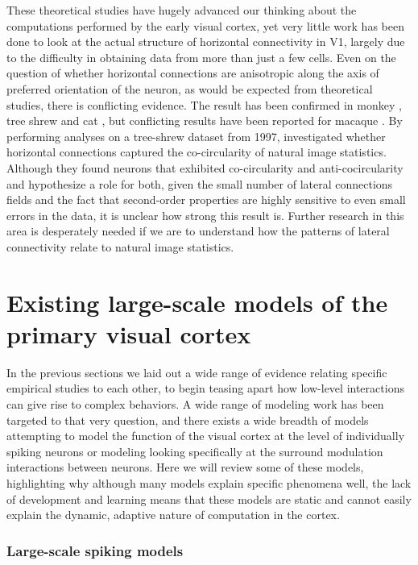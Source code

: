 These theoretical studies have hugely advanced our thinking about the
computations performed by the early visual cortex, yet very little
work has been done to look at the actual structure of horizontal
connectivity in V1, largely due to the difficulty in obtaining data
from more than just a few cells. Even on the question of whether
horizontal connections are anisotropic along the axis of preferred
orientation of the neuron, as would be expected from theoretical
studies, there is conflicting evidence. The result has been confirmed
in monkey \citep{Sincich2001}, tree shrew \citep{Bosking1997} and cat
\citep{Schmidt1997}, but conflicting results have been reported for
macaque \citep{Angelucci2002}. By performing analyses on a tree-shrew
dataset from 1997, \cite{Hunt2011} investigated whether horizontal 
connections captured the co-circularity of natural image
statistics. Although they found neurons that exhibited co-circularity
and anti-cocircularity and hypothesize a role for both, given the
small number of lateral connections fields and the fact that
second-order properties are highly sensitive to even small errors in
the data, it is unclear how strong this result is. Further research in
this area is desperately needed if we are to understand how the
patterns of lateral connectivity relate to natural image statistics.

\section{Existing large-scale models of the primary visual cortex}

In the previous sections we laid out a wide range of evidence
relating specific empirical studies to each other, to begin teasing
apart how low-level interactions can give rise to complex behaviors. A
wide range of modeling work has been targeted to that very
question, and there exists a wide breadth of models attempting to model
the function of the visual cortex at the level of individually spiking
neurons or modeling looking specifically at the surround modulation
interactions between neurons. Here we will review some of these
models, highlighting why although many models explain specific
phenomena well, the lack of development and learning means that these
models are static and cannot easily explain the dynamic, adaptive
nature of computation in the cortex.

\subsubsection*{Large-scale spiking models} \label{LargeModels}

